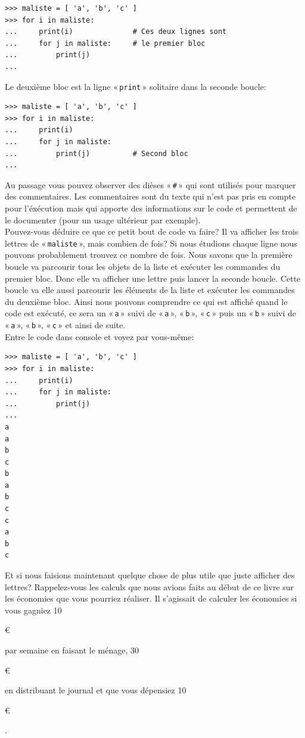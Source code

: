 \begin{Verbatim}[frame=single,rulecolor=\color{gray}, label=ne pas saisir]
>>> maliste = [ 'a', 'b', 'c' ]
>>> for i in maliste:
...     print(i)              # Ces deux lignes sont
...     for j in maliste:     # le premier bloc
...         print(j)
...
\end{Verbatim}

Le deuxième bloc est la ligne « \texttt{print} » solitaire dans la seconde boucle:

\begin{Verbatim}[frame=single,rulecolor=\color{gray}, label=ne pas saisir]
>>> maliste = [ 'a', 'b', 'c' ]
>>> for i in maliste:
...     print(i) 
...     for j in maliste:
...         print(j)          # Second bloc
...
\end{Verbatim}

Au passage vous pouvez observer des dièses « \texttt{\#} » qui sont utilisés pour marquer des commentaires. Les commentaires sont du texte qui n'est pas pris en compte pour l'éxécution mais qui apporte des informations sur le code et permettent de le documenter (pour un usage ultérieur par exemple).\\


Pouvez-vous déduire ce que ce petit bout de code va faire?
Il va afficher les trois lettres de « \texttt{maliste} », mais combien de fois?
Si nous étudions chaque ligne nous pouvons probablement trouvez ce nombre de fois.
Nous savons que la première boucle va parcourir tous les objets de la liste et exécuter
les commandes du premier bloc. Donc elle va afficher une lettre puis lancer la seconde boucle. Cette boucle va elle aussi parcourir les éléments de la liste et exécuter les commandes du deuxième bloc. Ainsi nous pouvons comprendre ce qui est affiché quand le code est exécuté, ce sera un « \texttt{a} »  suivi de « \texttt{a} », « \texttt{b} », « \texttt{c} » puis un « \texttt{b} »  suivi de « \texttt{a} », « \texttt{b} », « \texttt{c} » et ainsi de suite.\\

Entre le code dans console et voyez par vous-même:

\begin{Verbatim}[frame=single,rulecolor=\color{green}, label=à saisir avec attention]
>>> maliste = [ 'a', 'b', 'c' ]
>>> for i in maliste:
...     print(i)
...     for j in maliste:
...         print(j)
...
a
a
b
c
b
a
b
c
c
a
b
c
\end{Verbatim}

Et si nous faisions maintenant quelque chose de plus utile que juste afficher des lettres?
Rappelez-vous les calculs que nous avions faits au début de ce livre sur les économies que vous pourriez réaliser. Il s'agissait de calculer les économies si vous gagniez 10\begin{small}\euro\end{small} par semaine en faisant le ménage, 30\begin{small}\euro\end{small} en distribuant le journal et que vous dépensiez 10\begin{small}\euro\end{small}.\\

